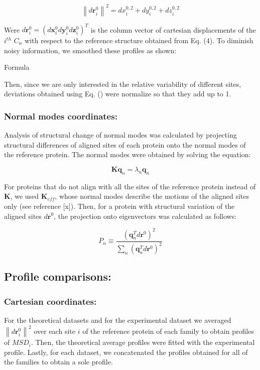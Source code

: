 \documentclass{article}
\begin{document}
\begin{multicols}{2}
{\begin{equation}
\left\|d\mathbf{r}^{0}_{i}\right\|^{2}=dx^{0,2}_{i}+dy^{0,2}_{i}+dz^{0,2}_{i}
\end{equation}

Were $d\mathbf{r}^{0}_{i}=(d\mathbf{x}^{0}_{i}d\mathbf{y}^{0}_{i}d\mathbf{z}^{0}_{i})^{T}$ is the column vector of cartesian displacements of the $i^{th}$ $C_{\alpha}$ with respect to the reference structure obtained from Eq. (4). To diminish noisy information, we smoothed these profiles as shown:

Formula 

Then, since we are only interested in the relative variability of different sites, deviations obtained using Eq. () were normalize so that they add up to 1.

\subsubsection*{Normal modes coordinates:}
Analysis of structural change of normal modes was calculated by projecting structural differences of aligned sites of each protein onto the normal modes of the reference protein. The normal modes were obtained by solving the equation:
  
\begin{equation}
\mathbf{K}\mathbf{q}_{n} = \lambda_{n}\mathbf{q}_{n} 
\end{equation}

For proteins that do not align with all the sites of the reference protein instead of $\mathbf{K}$, we used $\mathbf{K}_{eff}$, whose normal modes describe the motions of the aligned sites only (see reference [x]).
Then, for a protein with structural variation of the aligned sites $d\mathbf{r}^{0}$, the projection onto eigenvectors was calculated as follows:

\begin{equation}
P_{n} \equiv \frac{(\mathbf{q}^{T}_{n}d\mathbf{r}^{0})^2}{\sum_{n}(\mathbf{q}^{T}_{n}d\mathbf{r}^{0})^2}
\end{equation}

\subsection*{ Profile comparisons:}

\subsubsection*{Cartesian coordinates:} For the theoretical datasets and for the experimental dataset we averaged $\left\|d\mathbf{r}^{0}_{i}\right\|^{2}$ over each site $i$ of the reference protein of each family to obtain profiles of $MSD_{i}$. Then, the theoretical average profiles were fitted with the experimental profile. Lastly, for each dataset, we concatenated the profiles obtained for all of the families to obtain a sole profile.

}
\end{multicols}
\end{document}
